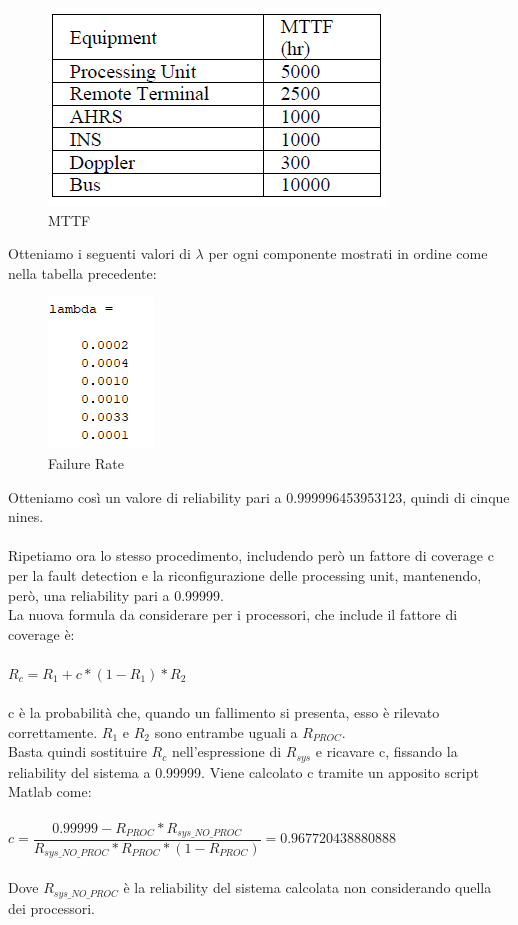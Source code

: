 		\begin{figure}[H]
			\centering
			\includegraphics[scale=0.7]{./immagine/mttf_es5.png}
			\caption{MTTF}
			\label{fig:mttf_es5}
		\end{figure}
		
	Otteniamo i seguenti valori di $\lambda$ per ogni componente mostrati in ordine come nella tabella precedente:
	
	\begin{figure}[H]
		\centering
		\includegraphics[scale=0.9]{./immagine/lambda_es5.png}
		\caption{Failure Rate}
		\label{fig:lambda_es5}
	\end{figure}
	
	Otteniamo così un valore di reliability pari a 0.999996453953123, quindi di cinque nines.\\\\
	Ripetiamo ora lo stesso procedimento, includendo però un fattore di coverage c per la fault detection e la riconfigurazione delle processing unit, mantenendo, però, una reliability pari a 0.99999.\\
	La nuova formula da considerare per i processori, che include il fattore di coverage è:\\\\
	$ R_{c}=R_{1}+c*(1-R_{1})*R_{2} $\\\\
	c è la probabilità che, quando un fallimento si presenta, esso è rilevato correttamente. $R_{1}$ e $R_{2}$ sono entrambe uguali a $R_{PROC}$.\\
	Basta quindi sostituire $R_{c}$ nell'espressione di $ R_{sys} $ e ricavare c, fissando la reliability del sistema a 0.99999. Viene calcolato c tramite un apposito script Matlab come:\\\\
	$ c=\dfrac{0.99999-R_{PROC}*R_{sys\_NO\_PROC}}{R_{sys\_NO\_PROC}*R_{PROC}*(1-R_{PROC})}=0.967720438880888$\\\\
	
	Dove $R_{sys\_NO\_PROC}$ è la reliability del sistema calcolata non considerando quella dei processori.